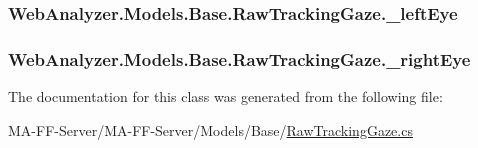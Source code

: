 \subsubsection[{\+\_\+left\+Eye}]{ Web\+Analyzer.\+Models.\+Base.\+Raw\+Tracking\+Gaze.\+\_\+left\+Eye\hspace{0.3cm}{\ttfamily [private]}}\label{class_web_analyzer_1_1_models_1_1_base_1_1_raw_tracking_gaze_a50d308230da6fdb235fa19273a8264da}
\hypertarget{class_web_analyzer_1_1_models_1_1_base_1_1_raw_tracking_gaze_abd10432d6263254b7ebefe31ade87131}{}
\subsubsection[{\+\_\+right\+Eye}]{ Web\+Analyzer.\+Models.\+Base.\+Raw\+Tracking\+Gaze.\+\_\+right\+Eye\hspace{0.3cm}{\ttfamily [private]}}\label{class_web_analyzer_1_1_models_1_1_base_1_1_raw_tracking_gaze_abd10432d6263254b7ebefe31ade87131}


The documentation for this class was generated from the following file\+:\begin{DoxyCompactItemize}
\item 
M\+A-\/\+F\+F-\/\+Server/\+M\+A-\/\+F\+F-\/\+Server/\+Models/\+Base/\hyperlink{_raw_tracking_gaze_8cs}{Raw\+Tracking\+Gaze.\+cs}\end{DoxyCompactItemize}
